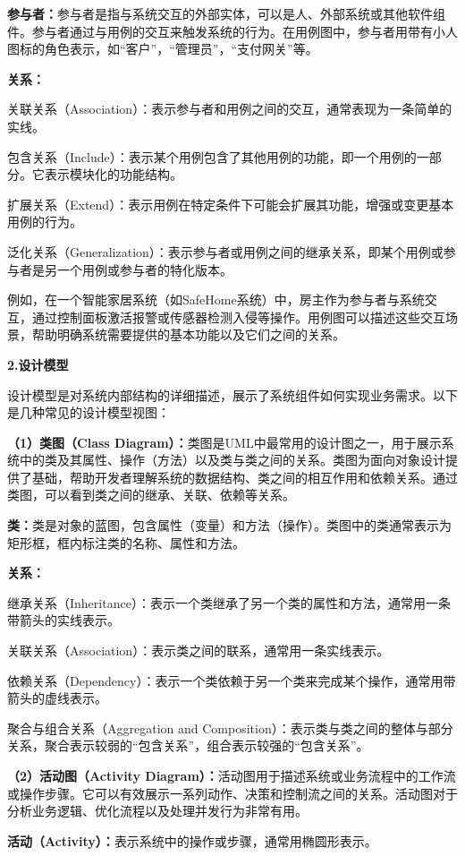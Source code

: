 \textbf{参与者：}参与者是指与系统交互的外部实体，可以是人、外部系统或其他软件组件。参与者通过与用例的交互来触发系统的行为。在用例图中，参与者用带有小人图标的角色表示，如``客户''，``管理员''，``支付网关''等。

\textbf{关系：}

关联关系（Association）：表示参与者和用例之间的交互，通常表现为一条简单的实线。

包含关系（Include）：表示某个用例包含了其他用例的功能，即一个用例的一部分。它表示模块化的功能结构。

扩展关系（Extend）：表示用例在特定条件下可能会扩展其功能，增强或变更基本用例的行为。

泛化关系（Generalization）：表示参与者或用例之间的继承关系，即某个用例或参与者是另一个用例或参与者的特化版本。

例如，在一个智能家居系统（如SafeHome系统）中，房主作为参与者与系统交互，通过控制面板激活报警或传感器检测入侵等操作。用例图可以描述这些交互场景，帮助明确系统需要提供的基本功能以及它们之间的关系。

\textbf{2.设计模型}

设计模型是对系统内部结构的详细描述，展示了系统组件如何实现业务需求。以下是几种常见的设计模型视图：

\textbf{（1）类图（Class Diagram）：}类图是UML中最常用的设计图之一，用于展示系统中的类及其属性、操作（方法）以及类与类之间的关系。类图为面向对象设计提供了基础，帮助开发者理解系统的数据结构、类之间的相互作用和依赖关系。通过类图，可以看到类之间的继承、关联、依赖等关系。

\textbf{类：}类是对象的蓝图，包含属性（变量）和方法（操作）。类图中的类通常表示为矩形框，框内标注类的名称、属性和方法。

\textbf{关系：}

继承关系（Inheritance）：表示一个类继承了另一个类的属性和方法，通常用一条带箭头的实线表示。

关联关系（Association）：表示类之间的联系，通常用一条实线表示。

依赖关系（Dependency）：表示一个类依赖于另一个类来完成某个操作，通常用带箭头的虚线表示。

聚合与组合关系（Aggregation and Composition）：表示类与类之间的整体与部分关系，聚合表示较弱的``包含关系''，组合表示较强的``包含关系''。

\textbf{（2）活动图（Activity Diagram）：}活动图用于描述系统或业务流程中的工作流或操作步骤。它可以有效展示一系列动作、决策和控制流之间的关系。活动图对于分析业务逻辑、优化流程以及处理并发行为非常有用。

\textbf{活动（Activity）：}表示系统中的操作或步骤，通常用椭圆形表示。

